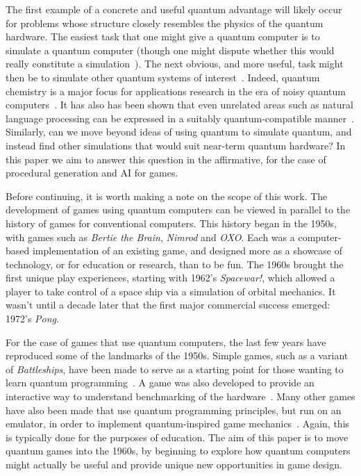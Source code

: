 \documentclass[conference]{IEEEtran}
\begin{document}
The first example of a concrete and useful quantum advantage will likely occur for problems whose structure closely resembles the physics of the quantum hardware. The easiest task that one might give a quantum computer is to simulate a quantum computer (though one might dispute whether this would really constitute a simulation~\cite{horsman:13}). The next obvious, and more useful, task might then be to simulate other quantum systems of interest~\cite{feynman}. Indeed, quantum chemistry is a major focus for applications research in the era of noisy quantum computers~\cite{kandala:17,ganzhorn:19}. It has also has been shown that even unrelated areas such as natural language processing can be expressed in a suitably quantum-compatible manner~\cite{kon:20}. Similarly, can we move beyond ideas of using quantum to simulate quantum, and instead find other simulations that would suit near-term quantum hardware? In this paper we aim to answer this question in the affirmative, for the case of procedural generation and AI for games.

Before continuing, it is worth making a note on the scope of this work. The development of games using quantum computers can be viewed in parallel to the history of games for conventional computers. This history began in the 1950s, with games such as  \textit{Bertie the Brain},  \textit{Nimrod} and  \textit{OXO}. Each was a computer-based implementation of an existing game, and designed more as a showcase of technology, or for education or research, than to be fun. The 1960s brought the first unique play experiences, starting with 1962’s \textit{Spacewar!}, which allowed a player to take control of a space ship via a simulation of orbital mechanics. It wasn’t until a decade later that the first major commercial success emerged: 1972’s  \textit{Pong}.

For the case of games that use quantum computers, the last few years have reproduced some of the landmarks of the 1950s. Simple games, such as a variant of \textit{Battleships}, have been made to serve as a starting point for those wanting to learn quantum programming~\cite{wootton:battleships}. A game was also developed to provide an interactive way to understand benchmarking of the hardware~\cite{wootton:awesomeness}. Many other games have also been made that use quantum programming principles, but run on an emulator, in order to implement quantum-inspired game mechanics~\cite{wootton:history}. Again, this is typically done for the purposes of education. The aim of this paper is to move quantum games into the 1960s, by beginning to explore how quantum computers might actually be useful and provide unique new opportunities in game design.
\end{document}
